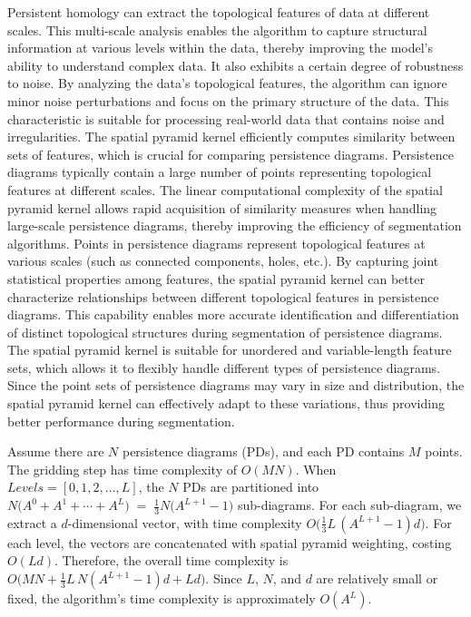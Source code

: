 \documentclass[5GeSdc,ASOC,numref,printGA,printHL,CASflow,nocrossmark,longtitle,PROOF]{/usr/local/texlive/iTemplates/01-Templates/01-Els-Jnl/01-Standard_Templates/V1/ELS_MDL5-V1-6}
\begin{document}
\begin{articlestyle}
{
Persistent homology can extract the topological features of data at different scales. This multi-scale analysis enables the algorithm to capture structural information at various levels within the data, thereby improving the model's ability to understand complex data. It also exhibits a certain degree of robustness to noise. By analyzing the data's topological features, the algorithm can ignore minor noise perturbations and focus on the primary structure of the data. This characteristic is suitable for processing real-world data that contains noise and irregularities.}
{
The spatial pyramid kernel efficiently computes similarity between sets of features, which is crucial for comparing persistence diagrams. Persistence diagrams typically contain a large number of points representing topological features at different scales. The linear computational complexity of the spatial pyramid kernel allows rapid acquisition of similarity measures when handling large-scale persistence diagrams, thereby improving the efficiency of segmentation algorithms. Points in persistence diagrams represent topological features at various scales (such as connected components, holes, etc.). By capturing joint statistical properties among features, the spatial pyramid kernel can better characterize relationships between different topological features in persistence diagrams. This capability enables more accurate identification and differentiation of distinct topological structures during segmentation of persistence diagrams. The spatial pyramid kernel is suitable for unordered and variable-length feature sets, which allows it to flexibly handle different types of persistence diagrams. Since the point sets of persistence diagrams may vary in size and distribution, the spatial pyramid kernel can effectively adapt to these variations, thus providing better performance during segmentation.}
	
{	
Assume there are $N$ persistence diagrams (PDs), and each PD contains $M$ points.
The gridding step has time complexity of $O(MN)$.
When $\textit{Levels} = [0,1,2,\ldots,L]$, the $N$ PDs are partitioned into
$
N\big(A^0 + A^1 + \cdots + A^L\big) \;=\; \tfrac{1}{3}N\big(A^{L+1}-1\big)
$
sub-diagrams. For each sub-diagram, we extract a $d$-dimensional vector, with time complexity
$
O\!\big(\tfrac{1}{3}L\,(A^{L+1}-1)d\big).
$
For each level, the vectors are concatenated with spatial pyramid weighting, costing $O(Ld)$.
Therefore, the overall time complexity is
$
O\!\big(MN+\tfrac{1}{3}L\,N(A^{L+1}-1)d+Ld\big).
$
Since $L$, $N$, and $d$ are relatively small or fixed, the algorithm's time complexity is approximately $O(A^L)$.
}


\end{articlestyle}
\end{document}
